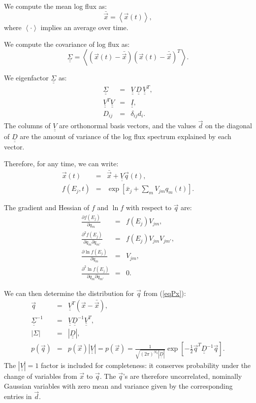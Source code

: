 \documentclass{article}    %
\newcommand{\dbul}[1]{\underline{\underline{#1}}}
\begin{document}
We compute the mean log flux as:
\begin{equation}
\bar{\vec{x}} = \left<\vec{x}(t)\right>,
\end{equation}
where $\left<\cdot\right>$ implies an average over time.

We compute the covariance of log flux as:
\begin{equation}
\dbul{\Sigma} = \left< \left(\vec{x}(t)-\bar{\vec{x}}\right)\left(\vec{x}(t)-\bar{\vec{x}}\right)^{T} \right>.
\end{equation}

We eigenfactor $\dbul{\Sigma}$ as:
\begin{eqnarray}
\dbul{\Sigma} &=& \dbul{V}\,\dbul{D}\,\dbul{V}^T, \\
\dbul{V}^T\dbul{V} &=& \dbul{I}, \\
D_{ij} &=& \delta_{ij}d_i.
\end{eqnarray}
The columns of $\dbul{V}$ are orthonormal basis vectors, and the
values $\vec{d}$ on the diagonal of $\dbul{D}$ are the amount of variance
of the log flux spectrum explained by each vector.

Therefore, for any time, we can write:
\begin{eqnarray}
\vec{x}(t) &=& \bar{\vec{x}} + \dbul{V}\vec{q}(t), \label{eqxVq}\\
f(E_j,t) &=& \exp\left[\bar{x}_j + \sum_m V_{jm}q_m(t)\right].
\end{eqnarray}

The gradient and Hessian of $f$ and $\ln f$ with respect to $\vec{q}$ are:
\begin{eqnarray}
\frac{\partial f(E_j)}{\partial q_m} &=& f(E_j)V_{jm}, \\
\frac{\partial^2 f(E_j)}{\partial q_m \partial q_{m'}} &=& f(E_j)V_{jm}V_{jm'}, \\
\frac{\partial \ln f(E_j)}{\partial q_m} &=& V_{jm}, \\
\frac{\partial^2 \ln f(E_j)}{\partial q_m \partial q_{m'}} &=& 0.
\end{eqnarray}

We can then determine the distribution for $\vec{q}$ from (\ref{eqPx}):
\begin{eqnarray}
\vec{q} &=& \dbul{V}^T(\vec{x}-\bar{\vec{x}}), \\
\dbul{\Sigma}^{-1} &=& \dbul{V}\dbul{D}^{-1}\dbul{V}^T, \\
|\Sigma| &=& |\dbul{D}|, \\
p(\vec{q}) 
&=& p(\vec{x})|\dbul{V}| = p(\vec{x})
= \frac{1}{\sqrt{(2\pi)^{N_q}|\dbul{D}|}}\exp\left[-\frac{1}{2}\vec{q}^T\dbul{D}^{-1}\vec{q}\right].
\end{eqnarray}
The $|\dbul{V}|=1$ factor is included for completeness: it conserves
probability under the change of variables from $\vec{x}$ to $\vec{q}$.  The $\vec{q}$'s are
therefore uncorrelated, nominally Gaussian variables with zero mean
and variance given by the corresponding entries in $\vec{d}$.
\end{document}

